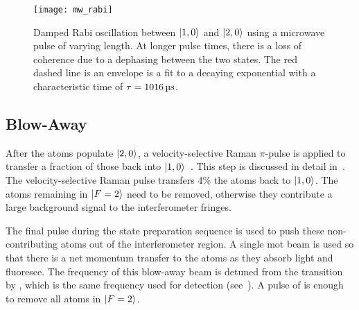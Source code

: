 \begin{figure}[!htbp]
    \centering
    \texttt{[image: mw\_rabi]}
    \caption[Microwave Rabi oscillation between \(\ket{1,0}\) and \(\ket{2,0}\)]{Damped Rabi oscillation between \(\ket{1,0}\) and \(\ket{2,0}\) using a microwave pulse of varying length. At longer pulse times, there is a loss of coherence due to a dephasing between the two states. The red dashed line is an envelope is a fit to a decaying exponential with a characteristic time of \(\tau = \sivalue{1016}{\micro\second}\).}
    \label{fig:mw_rabi}
\end{figure}

\subsection{Blow-Away}\label{subsec:blow_away}
After the atoms populate \(\ket{2,0}\), a velocity-selective Raman
\(\pi\)-pulse is applied to transfer a fraction of those back into
\(\ket{1,0}\)~\cite{Kasevich1991a}. This step is discussed in detail
in~. The velocity-selective Raman pulse
transfers 4\% the atoms
back to \(\ket{1,0}\). The atoms remaining in $\ket{F=2}$ need to be removed, otherwise
they contribute a large background signal to the interferometer
fringes. \par\noindent
The final pulse during the state preparation sequence is used to push
these non-contributing atoms out of the interferometer region. A
single \ac{mot} beam is used so that there is a net momentum transfer
to the atoms as they absorb light and fluoresce. The frequency of this
blow-away beam is detuned from the  transition by
, which is the same frequency used for
detection (see~). A pulse of
 is enough to remove all atoms in
\(\ket{F=2}\). 


